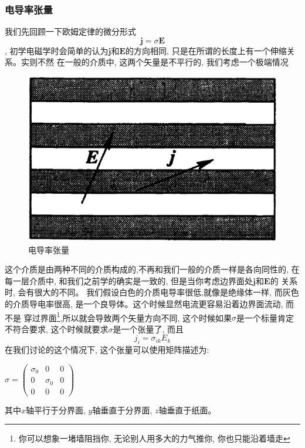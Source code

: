 \subsubsection*{电导率张量}
我们先回顾一下欧姆定律的微分形式$$\bm{j}=\sigma\bm{E}$$, 初学电磁学时会简单的认为$\bm{j}$和$\bm{E}$的方向相同, 只是在所谓的长度上有一个伸缩关系。实则不然
在一般的介质中, 这两个矢量是不平行的, 我们考虑一个极端情况
\begin{figure}[htbp]
    \centering
    \includegraphics[scale=0.3]{fig/a-4.eps}
    \caption{电导率张量}
\end{figure}
这个介质是由两种不同的介质构成的,不再和我们一般的介质一样是各向同性的, 在每一层介质中, 和我们之前学的确实是一致的, 但是当你考虑边界面处$\bm{j}$和$\bm{E}$的
关系时, 会有很大的不同。 我们假设白色的介质电导率很低,就像是绝缘体一样, 而灰色的介质导电率很高, 是一个良导体。这个时候显然电流更容易沿着边界面流动, 而不是
穿过界面\footnote[1]{你可以想象一堵墙阻挡你, 无论别人用多大的力气推你, 你也只能沿着墙走},所以就会导致两个矢量方向不同, 这个时候如果$\sigma$是一个标量肯定
不符合要求, 这个时候就要求$\sigma$是一个张量了, 而且$$j_i=\sigma_{ik}E_k$$在我们讨论的这个情况下, 这个张量可以使用矩阵描述为:
\begin{center}
    \begin{math}
        \displaystyle
        \sigma=
        \begin{pmatrix}
            \sigma_0&0&0\\
            0&\sigma_0&0\\
            0&0&0
        \end{pmatrix}
    \end{math}
\end{center}
其中$x$轴平行于分界面, $y$轴垂直于分界面, $z$轴垂直于纸面。

